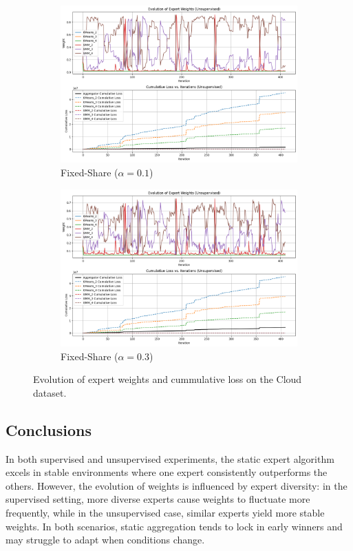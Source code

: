 \documentclass{article}
\begin{document}
\begin{figure}[ht]
\begin{subfigure}[b]{0.3\textwidth}
        \includegraphics[width=\textwidth]{cloud_fixed_0.1.png}
        \caption{Fixed-Share ($\alpha = 0.1$)}
        \label{fig:unsupervised_fixed_share_weights_0.1}
      \end{subfigure}
      \begin{subfigure}[b]{0.3\textwidth}
        \includegraphics[width=\textwidth]{cloud_fixed_0.3.png}
        \caption{Fixed-Share ($\alpha = 0.3$)}
        \label{fig:unsupervised_fixed_share_weights_0.3}
      \end{subfigure}
      \caption{Evolution of expert weights and cummulative loss on the Cloud dataset.}
      \label{fig:unsupervised_comparison}
    \end{figure}

\subsection*{Conclusions}
In both supervised and unsupervised experiments, the static expert algorithm excels in stable environments where one expert consistently outperforms the others. However, the evolution of weights is influenced by expert diversity: in the supervised setting, more diverse experts cause weights to fluctuate more frequently, while in the unsupervised case, similar experts yield more stable weights. In both scenarios, static aggregation tends to lock in early winners and may struggle to adapt when conditions change.
\end{document}
